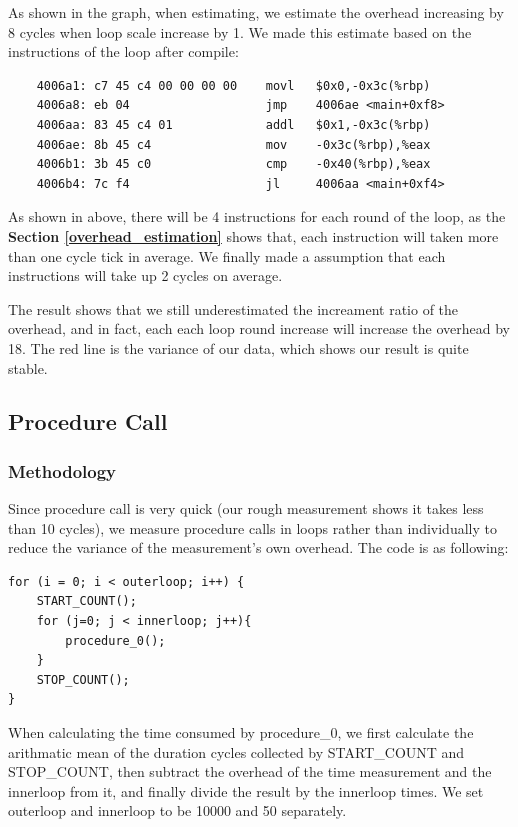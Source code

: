 As shown in the graph, when estimating, we estimate the overhead increasing by 8 cycles when loop scale increase by 1. We made this estimate based on the instructions of the loop after compile:

\begin{lstlisting}
    4006a1:	c7 45 c4 00 00 00 00 	movl   $0x0,-0x3c(%rbp)
    4006a8:	eb 04                	jmp    4006ae <main+0xf8>
    4006aa:	83 45 c4 01          	addl   $0x1,-0x3c(%rbp)
    4006ae:	8b 45 c4             	mov    -0x3c(%rbp),%eax
    4006b1:	3b 45 c0             	cmp    -0x40(%rbp),%eax
    4006b4:	7c f4                	jl     4006aa <main+0xf4>
\end{lstlisting}

As shown in above, there will be 4 instructions for each round of the loop, as the \textbf{Section \ref{overhead_estimation}} shows that, each instruction will taken more than one cycle tick in average.
We finally made a assumption that each instructions will take up 2 cycles on average.

The result shows that we still underestimated the increament ratio of the overhead, and in fact, each each loop round increase will increase the overhead by 18. The red line is the variance of our data, which shows our result is quite stable.

\subsection{Procedure Call}

\subsubsection{Methodology}

Since procedure call is very quick (our rough measurement shows it takes less than 10 cycles), we measure procedure calls in loops rather than individually to reduce the variance of the measurement's own overhead. The code is as following:

\begin{lstlisting}
for (i = 0; i < outerloop; i++) {
    START_COUNT();
    for (j=0; j < innerloop; j++){
        procedure_0();
    }
    STOP_COUNT();
}
\end{lstlisting}

When calculating the time consumed by procedure\_0, we first calculate the arithmatic mean of the duration cycles collected by START\_COUNT and STOP\_COUNT, then subtract the overhead of the time measurement and the innerloop from it, and finally divide the result by the innerloop times. We set outerloop and innerloop to be 10000 and 50 separately.

